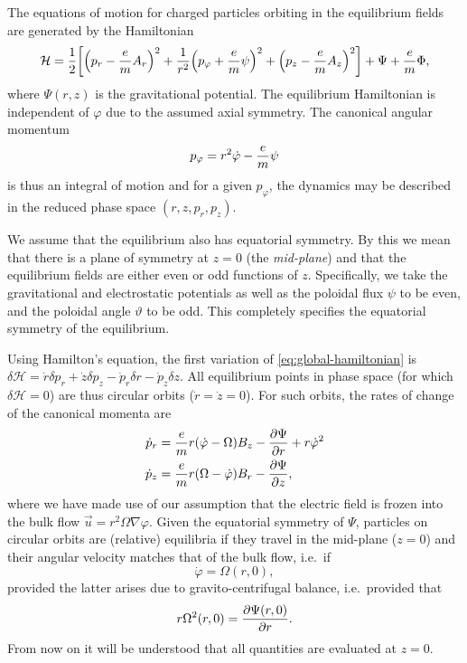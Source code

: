 \documentclass[aps,pre,notitlepage,amsmath,amssymb,amsfonts,nobibnotes,nofootinbib]{revtex4-1}
\begin{document}
The equations of motion for charged particles orbiting in the equilibrium
fields are generated by the Hamiltonian
\begin{equation}
  \label{eq:global-hamiltonian}
  \mathcal{H} = \frac{1}{2}\left[
    {\left(p_r - \cm A_r\right)}^2
    + \frac{1}{r^2}{\left(p_\varphi + \cm\psi\right)}^2
    + {\left(p_z - \cm A_z\right)}^2
  \right] + \Psi + \cm\Phi,
\end{equation}
where $\Psi(r,z)$ is the gravitational potential. The equilibrium Hamiltonian
is independent of $\varphi$ due to the assumed axial symmetry. The canonical
angular momentum
\begin{equation}
  \label{eq:canonical-angular-momentum}
  p_\varphi = r^2\dot{\varphi} - \cm\psi
\end{equation}
is thus an integral of motion and for a given $p_\varphi$, the dynamics may be
described in the reduced phase space $(r,z,p_r,p_z)$.

We assume that the equilibrium also has equatorial symmetry. By this we mean
that there is a plane of symmetry at $z=0$ (the \emph{mid-plane}) and that the
equilibrium fields are either even or odd functions of $z$. Specifically, we
take the gravitational and electrostatic potentials as well as the poloidal
flux $\psi$ to be even, and the poloidal angle $\vartheta$ to be odd. This
completely specifies the equatorial symmetry of the equilibrium.

Using Hamilton's equation, the first variation of \cref{eq:global-hamiltonian}
is $\delta\mathcal{H}=\dot{r}\delta{}p_r+\dot{z}\delta{}p_z
-\dot{p}_r\delta{}r-\dot{p}_z\delta{}z$. All equilibrium points in phase space
(for which $\delta\mathcal{H}=0$) are thus circular orbits
($\dot{r}=\dot{z}=0$). For such orbits, the rates of change of the canonical
momenta are
\begin{align}
  \dot{p}_r &= \frac{e}{m} r(\dot{\varphi} - \Omega) B_z
  - \frac{\partial\Psi}{\partial r} + r\dot{\varphi}^2 \\
  \dot{p}_z &= \frac{e}{m} r(\Omega - \dot{\varphi}) B_r
  - \frac{\partial\Psi}{\partial z},
\end{align}
where we have made use of our assumption that the electric field is frozen
into the bulk flow $\vec{u}=r^2\Omega\nabla\varphi$. Given the equatorial
symmetry of $\Psi$, particles on circular orbits are (relative) equilibria if
they travel in the mid-plane ($z=0$) and their angular velocity matches that
of the bulk flow, i.e.\ if
\begin{equation}
  \dot{\varphi} = \Omega(r,0),
\end{equation}
provided the latter arises due to gravito-centrifugal balance, i.e.\ provided
that
\begin{equation}
  r\Omega^2(r,0) = \frac{\partial\Psi(r,0)}{\partial r}.
\end{equation}
From now on it will be understood that all quantities are evaluated at $z=0$.
\end{document}
